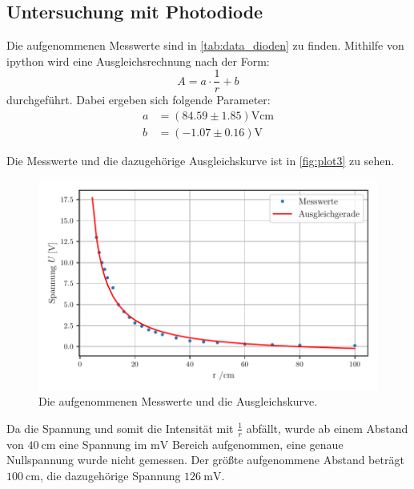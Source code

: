 \subsection{Untersuchung mit Photodiode}
\label{subsec:Photodiode}

Die aufgenommenen Messwerte sind in \autoref{tab:data_dioden} zu finden.
Mithilfe von ipython wird eine Ausgleichsrechnung nach der Form:
\begin{equation*}
  A = a \cdot \frac{1}{r} + b
\end{equation*}
durchgeführt.
Dabei ergeben sich folgende Parameter:
\begin{align*}
  a &= (84.59 \pm 1.85) \si{\volt\centi\metre}\\
  b &= (-1.07 \pm 0.16) \si{\volt}
\end{align*}

Die Messwerte und die dazugehörige Ausgleichskurve ist in \autoref{fig:plot3} zu sehen.
\begin{figure}
  \centering
  \includegraphics[width=\textwidth]{content/abbildungen/plot3.pdf}
  \caption{Die aufgenommenen Messwerte und die Ausgleichskurve.}
  \label{fig:plot3}
\end{figure}

\noindent
Da die Spannung und somit die Intensität mit $\frac{1}{r}$ abfällt, wurde ab einem Abstand von $\SI{40}{\centi\metre}$ eine Spannung im
$\si{\milli\volt}$ Bereich aufgenommen, eine genaue Nullspannung wurde nicht gemessen.
Der größte aufgenommene Abstand beträgt $\SI{100}{\centi\metre}$, die dazugehörige Spannung $\SI{126}{\milli\volt}$.

